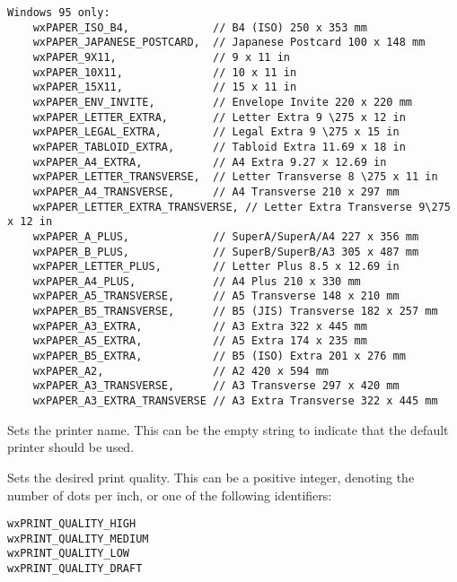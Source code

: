 {\begin{verbatim}
Windows 95 only:
    wxPAPER_ISO_B4,             // B4 (ISO) 250 x 353 mm
    wxPAPER_JAPANESE_POSTCARD,  // Japanese Postcard 100 x 148 mm
    wxPAPER_9X11,               // 9 x 11 in
    wxPAPER_10X11,              // 10 x 11 in
    wxPAPER_15X11,              // 15 x 11 in
    wxPAPER_ENV_INVITE,         // Envelope Invite 220 x 220 mm
    wxPAPER_LETTER_EXTRA,       // Letter Extra 9 \275 x 12 in
    wxPAPER_LEGAL_EXTRA,        // Legal Extra 9 \275 x 15 in
    wxPAPER_TABLOID_EXTRA,      // Tabloid Extra 11.69 x 18 in
    wxPAPER_A4_EXTRA,           // A4 Extra 9.27 x 12.69 in
    wxPAPER_LETTER_TRANSVERSE,  // Letter Transverse 8 \275 x 11 in
    wxPAPER_A4_TRANSVERSE,      // A4 Transverse 210 x 297 mm
    wxPAPER_LETTER_EXTRA_TRANSVERSE, // Letter Extra Transverse 9\275 x 12 in
    wxPAPER_A_PLUS,             // SuperA/SuperA/A4 227 x 356 mm
    wxPAPER_B_PLUS,             // SuperB/SuperB/A3 305 x 487 mm
    wxPAPER_LETTER_PLUS,        // Letter Plus 8.5 x 12.69 in
    wxPAPER_A4_PLUS,            // A4 Plus 210 x 330 mm
    wxPAPER_A5_TRANSVERSE,      // A5 Transverse 148 x 210 mm
    wxPAPER_B5_TRANSVERSE,      // B5 (JIS) Transverse 182 x 257 mm
    wxPAPER_A3_EXTRA,           // A3 Extra 322 x 445 mm
    wxPAPER_A5_EXTRA,           // A5 Extra 174 x 235 mm
    wxPAPER_B5_EXTRA,           // B5 (ISO) Extra 201 x 276 mm
    wxPAPER_A2,                 // A2 420 x 594 mm
    wxPAPER_A3_TRANSVERSE,      // A3 Transverse 297 x 420 mm
    wxPAPER_A3_EXTRA_TRANSVERSE // A3 Extra Transverse 322 x 445 mm
\end{verbatim}
}


\label{wxprintdatasetprintername}


Sets the printer name. This can be the empty string to indicate that the default
printer should be used.


\label{wxprintdatasetquality}


Sets the desired print quality. This can be a positive integer, denoting the number of dots per inch, or
one of the following identifiers:

\begin{verbatim}
wxPRINT_QUALITY_HIGH
wxPRINT_QUALITY_MEDIUM
wxPRINT_QUALITY_LOW
wxPRINT_QUALITY_DRAFT
\end{verbatim}

